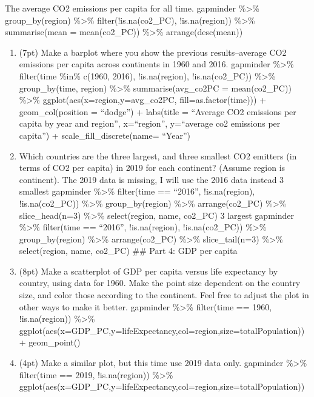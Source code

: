 \documentclass[]{article}
\begin{document}
The average CO2 emissions per capita for all time. gapminder
\%\textgreater{}\% group\_by(region) \%\textgreater{}\%
filter(!is.na(co2\_PC), !is.na(region)) \%\textgreater{}\%
summarise(mean = mean(co2\_PC)) \%\textgreater{}\% arrange(desc(mean))

\begin{enumerate}
\def\labelenumi{\arabic{enumi}.}
\setcounter{enumi}{4}
\item
  (7pt) Make a barplot where you show the previous results--average CO2
  emissions per capita across continents in 1960 and 2016. gapminder
  \%\textgreater{}\% filter(time \%in\% c(1960, 2016), !is.na(region),
  !is.na(co2\_PC)) \%\textgreater{}\% group\_by(time, region)
  \%\textgreater{}\% summarise(avg\_co2PC = mean(co2\_PC))
  \%\textgreater{}\% ggplot(aes(x=region,y=avg\_co2PC,
  fill=as.factor(time))) + geom\_col(position = ``dodge'') + labs(title
  = ``Average CO2 emissions per capita by year and region'',
  x=``region'', y=``average co2 emissions per capita'') +
  scale\_fill\_discrete(name= ``Year'')
\item
  Which countries are the three largest, and three smallest CO2 emitters
  (in terms of CO2 per capita) in 2019 for each continent? (Assume
  region is continent). The 2019 data is missing, I will use the 2016
  data instead 3 smallest gapminder \%\textgreater{}\% filter(time ==
  ``2016'', !is.na(region), !is.na(co2\_PC)) \%\textgreater{}\%
  group\_by(region) \%\textgreater{}\% arrange(co2\_PC)
  \%\textgreater{}\% slice\_head(n=3) \%\textgreater{}\% select(region,
  name, co2\_PC) 3 largest gapminder \%\textgreater{}\% filter(time ==
  ``2016'', !is.na(region), !is.na(co2\_PC)) \%\textgreater{}\%
  group\_by(region) \%\textgreater{}\% arrange(co2\_PC)
  \%\textgreater{}\% slice\_tail(n=3) \%\textgreater{}\% select(region,
  name, co2\_PC) \#\# Part 4: GDP per capita
\item
  (8pt) Make a scatterplot of GDP per capita versus life expectancy by
  country, using data for 1960. Make the point size dependent on the
  country size, and color those according to the continent. Feel free to
  adjust the plot in other ways to make it better. gapminder
  \%\textgreater{}\% filter(time == 1960, !is.na(region))
  \%\textgreater{}\%
  ggplot(aes(x=GDP\_PC,y=lifeExpectancy,col=region,size=totalPopulation))
  + geom\_point()
\item
  (4pt) Make a similar plot, but this time use 2019 data only. gapminder
  \%\textgreater{}\% filter(time == 2019, !is.na(region))
  \%\textgreater{}\%
  ggplot(aes(x=GDP\_PC,y=lifeExpectancy,col=region,size=totalPopulation))

\end{enumerate}
\end{document}
